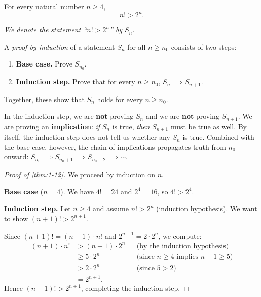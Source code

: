 \begin{theorem}
\label{thm:1-12}
For every natural number $n \ge 4$,
\[
  n! > 2^{n}.
\]
\end{theorem}

\textit{We denote the statement ``$n! > 2^{n}$'' by $S_{n}$.}

\begin{definition}
\label{def:1-12}
A \emph{proof by induction} of a statement $S_{n}$ for all $n \ge n_{0}$ consists of two steps:
\begin{enumerate}[label=(\roman*)]
  \item \textbf{Base case.}  Prove $S_{n_{0}}$.
  \item \textbf{Induction step.}  Prove that for every $n \ge n_{0}$, $S_{n} \implies S_{n+1}$.
\end{enumerate}
Together, these show that $S_{n}$ holds for every $n \ge n_{0}$.
\end{definition}

\begin{remark}
In the induction step, we are \textbf{not} proving $S_{n}$ and we are \textbf{not} proving $S_{n+1}$.  We are proving an \textbf{implication}: \textit{if} $S_{n}$ is true, \textit{then} $S_{n+1}$ must be true as well.  By itself, the induction step does not tell us whether any $S_{n}$ is true.  Combined with the base case, however, the chain of implications propagates truth from $n_{0}$ onward: $S_{n_{0}} \implies S_{n_{0}+1} \implies S_{n_{0}+2} \implies \cdots$.
\end{remark}

\begin{proof}[Proof of \cref{thm:1-12}]
We proceed by induction on $n$.

\textbf{Base case} ($n = 4$).  We have $4! = 24$ and $2^{4} = 16$, so $4! > 2^{4}$.

\textbf{Induction step.}  Let $n \ge 4$ and assume $n! > 2^{n}$ (induction hypothesis).  We want to show $(n+1)! > 2^{n+1}$.

Since $(n+1)! = (n+1) \cdot n!$ and $2^{n+1} = 2 \cdot 2^{n}$, we compute:
\begin{align*}
  (n+1) \cdot n! &> (n+1) \cdot 2^{n} &&\text{(by the induction hypothesis)} \\
                 &\ge 5 \cdot 2^{n}     &&\text{(since } n \ge 4 \text{ implies } n+1 \ge 5\text{)} \\
                 &> 2 \cdot 2^{n}        &&\text{(since } 5 > 2\text{)} \\
                 &= 2^{n+1}.
\end{align*}
Hence $(n+1)! > 2^{n+1}$, completing the induction step.
\end{proof}

